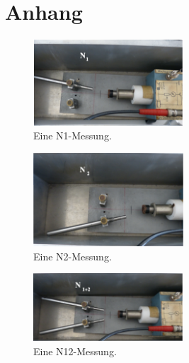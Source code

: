 \section{Anhang}
\label{sec:Anhang}
\begin{figure}
    \centering
    \includegraphics[width=0.5\textwidth]{bilder/Messung_N1.png}
    \caption{Eine N1-Messung.}
    \label{fig:Messung_N1}
\end{figure}
\begin{figure}
    \centering
    \includegraphics[width=0.5\textwidth]{bilder/Messung_N2.png}
    \caption{Eine N2-Messung.}
    \label{fig:Messung_N2}
\end{figure}
\begin{figure}
    \centering
    \includegraphics[width=0.5\textwidth]{bilder/Messung_N12.png}
    \caption{Eine N12-Messung.}
    \label{fig:Messung_N12}
\end{figure}